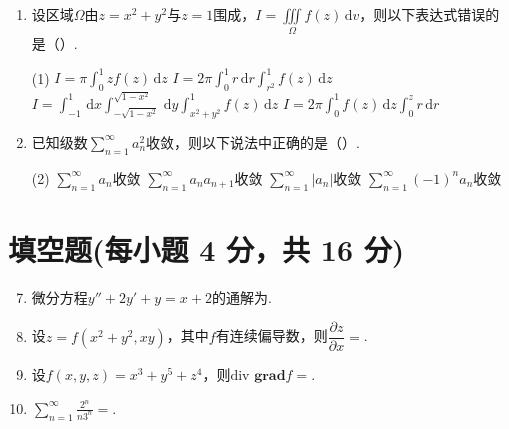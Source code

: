 \documentclass[../Main.tex]{subfiles}
\begin{document}
\begin{enumerate}
    \item \begin{minipage}[t]{0.93\linewidth}
              设区域$\Omega$由$z=x^{2}+y^{2}$与$z=1$围成，\(I=\iiint\limits_{\Omega}f(z)\,\mathrm{d}v\)，则以下表达式错误的是（\qquad）.\par\smallskip
              \begin{tasks}[label=\textbf{\Alph*.}, label-width=1.5em, column-sep=1em](1)
                  \task $\displaystyle I=\pi\int_{0}^{1}zf(z)\,\mathrm{d}z$ \qquad
                  \task $\displaystyle I=2\pi\int_{0}^{1}r\,\mathrm{d}r\int_{r^{2}}^{1}f(z)\,\mathrm{d}z$
                  \task $\displaystyle I=\int_{-1}^{1}\,\mathrm{d}x\int_{-\sqrt{1-x^{2}}}^{\sqrt{1-x^{2}}}\,\mathrm{d}y\int_{x^{2}+y^{2}}^{1}f(z)\,\mathrm{d}z$
                  \task $\displaystyle I=2\pi\int_{0}^{1}f(z)\,\mathrm{d}z\int_{0}^{z}r\,\mathrm{d}r$
              \end{tasks}
          \end{minipage}

    \item 已知级数$\sum\limits_{n=1}^{\infty}a_{n}^{2}$收敛，则以下说法中正确的是（\qquad）.
          \begin{tasks}[label=\textbf{\Alph*.}, label-width=1.5em, column-sep=1em](2)
              \task $\displaystyle\sum_{n=1}^{\infty}a_n$收敛
              \task $\displaystyle\sum_{n=1}^{\infty}a_na_{n+1}$收敛
              \task $\displaystyle\sum_{n=1}^{\infty}|a_n|$收敛
              \task $\displaystyle\sum_{n=1}^{\infty}(-1)^na_n$收敛
          \end{tasks}
\end{enumerate}

\section{填空题(每小题 4 分，共 16 分)}
\begin{enumerate}
    \setcounter{enumi}{6}
    \item 微分方程$y''+2y'+y=x+2$的通解为\underline{\hspace{5em}}.
          \vspace{1em}

    \item 设$z=f(x^{2}+y^{2},xy)$，其中$f$有连续偏导数，则$\dfrac{\partial z}{\partial x}=$\underline{\hspace{5em}}.
          \vspace{1em}

    \item 设$f(x,y,z)=x^{3}+y^{5}+z^{4}$，则$\text{div }\textbf{grad}f=$\underline{\hspace{5em}}.
          \vspace{1em}

    \item $\displaystyle\sum_{n=1}^{\infty}\frac{2^{n}}{n3^{n}}=$\underline{\hspace{5em}}.
          \vspace{1em}
\end{enumerate}
\end{document}
